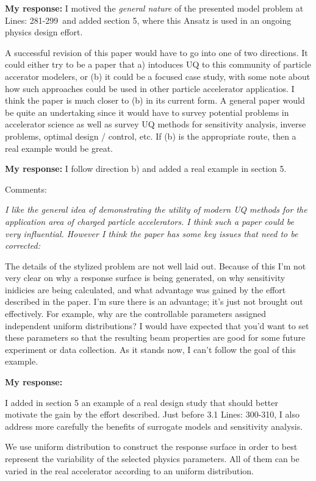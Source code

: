 \documentclass{article}
\newcommand{\atline}[1]{\color{red} Lines: #1\color{blue}}
\begin{document}
{\bf My response: }{\color{blue} I motived the {\it general nature} of the presented model problem at \atline{281-299}\ and added section 5, where this Ansatz is
used in an ongoing physics design effort. }

{\it

A successful revision of this paper would have to go into one of two 
directions. It could either try to be a paper that a) intoduces UQ to this 
community of particle accerator modelers, or (b) it could be a focused case 
study, with some note about how such approaches could be used in other 
particle accelerator applicatios. I think the paper is much closer to (b) 
in its current form. A general paper would be quite an undertaking since 
it would have to survey potential problems in accelerator science as well 
as survey UQ methods for sensitivity analysis, inverse problems, optimal 
design / control, etc. If (b) is the appropriate route, then a real 
example would be great. }

{\bf My response: }{\color{blue} I follow direction b) and added a real example in section 5. }

Comments: 

{\it I like the general idea of demonstrating the utility of modern UQ 
methods for the application area of charged particle accelerators. I think 
such a paper could be very influential. However I think the paper has 
some key issues that need to be corrected: 

The details of the stylized problem are not well laid out. Because of this 
I'm not very clear on why a response surface is being generated, on why 
sensitivity inidicies are being calculated, and what advantage was gained 
by the effort described in the paper. I'm sure there is an advantage; it's 
just not brought out effectively. For example, why are the controllable 
parameters assigned independent uniform distributions? I would have 
expected that you'd want to set these parameters so that the resulting 
beam properties are good for some future experiment or data collection. 
As it stands now, I can't follow the goal of this example. 
}

{\bf My response: }{\color{blue} 

I added in section 5 an example of a real design study that should better motivate the gain 
by the effort described. Just before 3.1 \atline{300-310},  I also address more carefully  the 
benefits of surrogate models and sensitivity analysis.

We use uniform distribution to construct the response surface in order to best 
represent the variability of the selected physics parameters. All of them can be
varied in the real accelerator according to an uniform distribution.

} 
\end{document}
